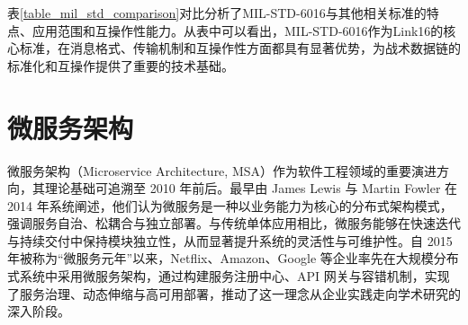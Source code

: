 表\ref{table_mil_std_comparison}对比分析了MIL-STD-6016与其他相关标准的特点、应用范围和互操作性能力。从表中可以看出，MIL-STD-6016作为Link16的核心标准，在消息格式、传输机制和互操作性方面都具有显著优势，为战术数据链的标准化和互操作提供了重要的技术基础。

\begin{table}[!htb]
    \caption{MIL-STD-6016相关标准对比分析表}
    \label{table_mil_std_comparison}
    \centering
\end{table}

\section{微服务架构}

微服务架构（Microservice Architecture, MSA）作为软件工程领域的重要演进方向，其理论基础可追溯至 2010 年前后。最早由 James Lewis 与 Martin Fowler 在 2014 年系统阐述，他们认为微服务是一种以业务能力为核心的分布式架构模式，强调服务自治、松耦合与独立部署。与传统单体应用相比，微服务能够在快速迭代与持续交付中保持模块独立性，从而显著提升系统的灵活性与可维护性。自 2015 年被称为“微服务元年”以来，Netflix、Amazon、Google 等企业率先在大规模分布式系统中采用微服务架构，通过构建服务注册中心、API 网关与容错机制，实现了服务治理、动态伸缩与高可用部署，推动了这一理念从企业实践走向学术研究的深入阶段。

